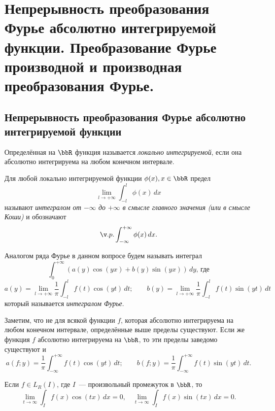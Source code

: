 \chapter{Непрерывность преобразования Фурье абсолютно интегрируемой функции. Преобразование Фурье производной и производная преобразования Фурье.}

\section{Непрерывность преобразования Фурье абсолютно интегрируемой функции}

\begin{defn}
Определённая на $\bbR$ функция называется \textit{локально интегрируемой}, если она абсолютно интегрируема на любом конечном интервале.
\end{defn}

\begin{defn}
Для любой локально интегрируемой функции $\phi(x), x \in \bbR$ предел
$$
\lim_{l \to +\infty}\int_{-l}^{l} \phi(x)\,dx
$$
называют \textit{интегралом от $-\infty$ до $+\infty$ в смысле главного значения (или в смысле Коши)} и обозначают
$$
\v.p.\int_{-\infty}^{+\infty} \phi(x)\,dx.
$$
\end{defn}

Аналогом ряда Фурье в данном вопросе будем называть интеграл
$$
\int_{0}^{+\infty} (a(y)\cos(yx) + b(y)\sin(yx))\,dy,\, \text{где}
$$
$$
a(y) = \lim_{l \to +\infty}\frac{1}{\pi}\int_{-l}^{l} f(t)\cos(yt)\,dt;\qquad 
b(y) = \lim_{l \to +\infty}\frac{1}{\pi}\int_{-l}^{l} f(t)\sin(yt)\,dt
$$
который называется \textit{интегралом Фурье}.

Заметим, что не для всякой функции $f$, которая абсолютно интегрируема на любом конечном интервале, определённые выше пределы существуют. Если же функция $f$ абсолютно интегрируема на $\bbR$, то эти пределы заведомо существуют и
\begin{equation} \label{ch19eq1}
a(f;y) = \frac{1}{\pi}\int_{-\infty}^{+\infty} f(t)\cos(yt)\,dt;
\qquad
b(f;y) = \frac{1}{\pi}\int_{-\infty}^{+\infty} f(t)\sin(yt)\,dt.
\end{equation}

\begin{thm}
\label{th22:1}
Если $f \in L_R(I)$, где $I$~--- произвольный промежуток в $\bbR$, то
$$
\lim_{t \to \infty}\int_{I} f(x)\cos(tx)\,dx = 0, \quad
\lim_{t \to \infty}\int_{I} f(x)\sin(tx)\,dx = 0.
$$
\end{thm}

